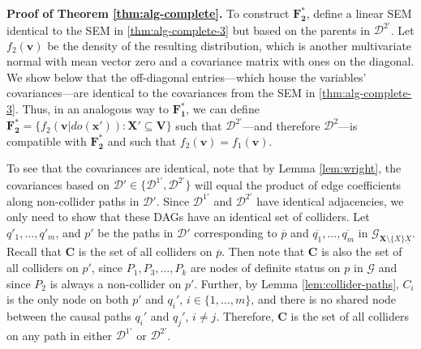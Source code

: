 \documentclass[11pt]{article}
\newcommand{\mb}[1]{\mathbf{#1}}
\newcommand{\g}[1][G]{\mathcal{#1}}
\newenvironment{proofofnoqed}[1][]{\noindent \textbf{Proof of #1.}}{}
\begin{document}
\begin{proofofnoqed}[Theorem \ref{thm:alg-complete}]
    To construct $\mb{F^*_2}$, define a linear SEM identical to the SEM in \eqref{thm:alg-complete-3} but based on the parents in $\g[D]^{2'}$. Let $f_2(\mb{v})$ be the density of the resulting distribution, which is another multivariate normal with mean vector zero and a covariance matrix with ones on the diagonal. We show below that the off-diagonal entries---which house the variables' covariances---are identical to the covariances from the SEM in \eqref{thm:alg-complete-3}. Thus, in an analogous way to $\mb{F^*_1}$, we can define $\mb{F^*_2} = \{ f_2(\mb{v}|do(\mb{x'})) : \mb{X'} \subseteq \mb{V} \}$ such that $\g[D]^{2'}$---and therefore $\g[D]^2$---is compatible with $\mb{F^*_2}$ and such that $f_2(\mb{v}) = f_1(\mb{v})$.

    To see that the covariances are identical, note that by Lemma \ref{lem:wright}, the covariances based on $\g[D]' \in \{ \g[D]^{1'}, \g[D]^{2'} \}$ will equal the product of edge coefficients along non-collider paths in $\g[D]'$. Since $\g[D]^{1'}$ and $\g[D]^{2'}$ have identical adjacencies, we only need to show that these DAGs have an identical set of colliders. Let $q'_1, \dots, q'_m$, and $p'$ be the paths in $\g[D]'$ corresponding to $\overline{p}$ and $\overline{q_1}, \dots, \overline{q_m}$ in $\g_{\overline{\mb{X} \setminus \{X\}} \underline{X}}$. Recall that $\mb{C}$ is the set of all colliders on $\overline{p}$. Then note that $\mb{C}$ is also the set of all colliders on $p'$, since $P_1, P_3, \dots, P_k$ are nodes of definite status on $p$ in $\g$ and since $P_2$ is always a non-collider on $p'$. Further, by Lemma \ref{lem:collider-paths}, $C_i$ is the only node on both $p'$ and $q_i'$, $i \in \{1, \dots, m\}$, and there is no shared node between the causal paths $q_i'$ and $q_j'$, $i \neq j$. Therefore, $\mb{C}$ is the set of all colliders on any path in either $\g[D]^{1'}$ or $\g[D]^{2'}$.


\end{proofofnoqed}
\end{document}
